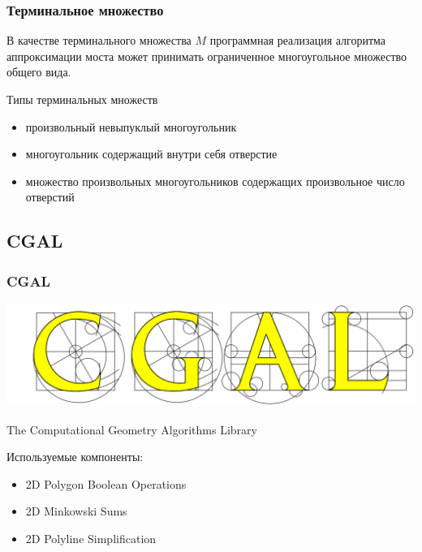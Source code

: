\documentclass{beamer}
\begin{document}
  \begin{frame}
    \frametitle{Терминальное множество}
    
   В качестве терминального множества $M$ программная реализация алгоритма аппроксимации моста может принимать ограниченное многоугольное множество общего вида.

\vspace{1em}

    \begin{block}{Типы терминальных множеств}
      \begin{itemize}
        \item произвольный невыпуклый многоугольник
        \item многоугольник содержащий внутри себя отверстие
        \item множество произвольных многоугольников содержащих произвольное число отверстий
      \end{itemize}
    \end{block}

  \end{frame}
  

   \subsection{CGAL} 
  
   \begin{frame}
     \frametitle{CGAL}
     \includegraphics[width=1.0\textwidth]{cgal-logo}
 
     The Computational Geometry Algorithms Library
 
     Используемые компоненты:
 
     \begin{itemize}
         \item 2D Polygon Boolean Operations
         \item 2D Minkowski Sums
         \item 2D Polyline Simplification
     \end{itemize}
 
    \end{frame}
\end{document}
